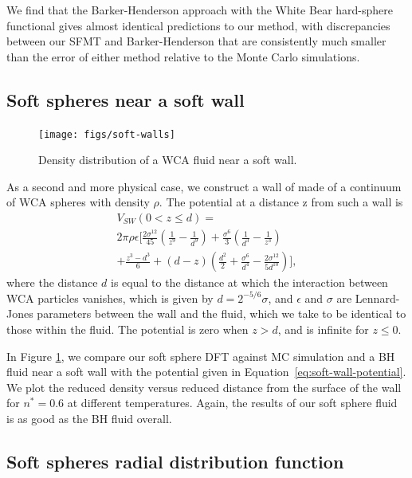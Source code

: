 \documentclass[letterpaper,twocolumn,amsmath,amssymb,prb]{revtex4-1}
\begin{document}
We find that the Barker-Henderson approach with the White Bear
hard-sphere functional gives almost identical predictions to our
method, with discrepancies between our SFMT and Barker-Henderson that
are consistently much smaller than the error of either method relative
to the Monte Carlo simulations.

\subsection{Soft spheres near a soft wall}

\begin{figure}
  \centering
  \texttt{[image: figs/soft-walls]}
  \caption{Density distribution of a WCA fluid near a soft wall.}
  \label{fig:soft-walls}
\end{figure}

As a second and more physical case, we construct a wall of made of a
continuum of WCA spheres with density $\rho$.  The potential
at a distance z from such a wall is
\begin{multline}
  V_{SW}(0 < z \leq d) = \\
  2\pi\rho\epsilon\Big[
  \frac{2\sigma^{12}}{45} \left(\frac{1}{z^9}-\frac{1}{d^9}\right)
  +\frac{\sigma^6}{3}\left(\frac{1}{d^3}-\frac{1}{z^3}
  \right) \\
  + \frac{z^3-d^3}{6} + \left( d - z \right)\left(\frac{d^2}{2} +
  \frac{\sigma^6}{d^4} - \frac{2\sigma^{12}}{5d^{10}}\right)
  \Bigg],
\label{eq:soft-wall-potential}
\end{multline}
where the distance $d$ is equal to the distance at which the
interaction between WCA particles vanishes, which is given by $d =
2^{-5/6}\sigma$, and $\epsilon$ and $\sigma$ are Lennard-Jones
parameters between the wall and the fluid, which we take to be
identical to those within the fluid. The potential is zero when $z>d$,
and is infinite for $z\leq 0$.

In Figure \ref{fig:soft-walls}, we compare our soft sphere DFT
against MC simulation and a BH fluid near a soft wall
with the potential given in Equation~\ref{eq:soft-wall-potential}. We
plot the reduced density versus reduced distance from the surface of
the wall for $n^*=0.6$ at different temperatures. Again, the results
of our soft sphere fluid is as good as the BH fluid
overall.

\subsection{Soft spheres radial distribution function}
\end{document}
